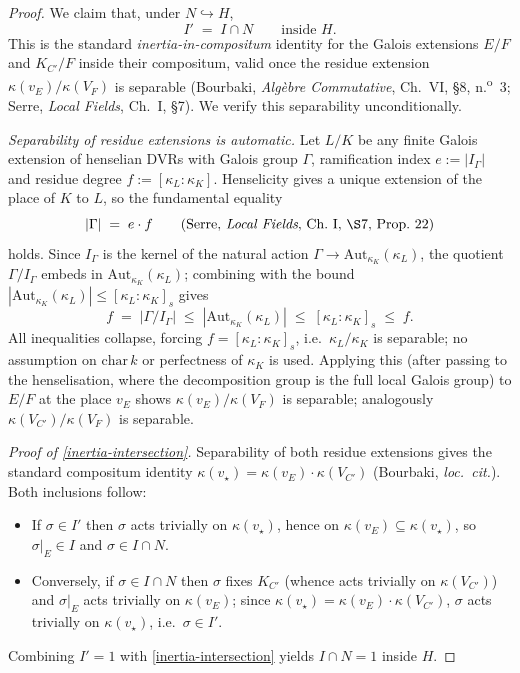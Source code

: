 \documentclass[11pt]{article}
\begin{document}
\begin{proof}
We claim that, under $N \hookrightarrow H$,
\begin{equation}\label{eq:inertia-intersection}
I' \;=\; I \cap N \qquad \text{inside } H .
\end{equation}
This is the standard \emph{inertia-in-compositum} identity for the Galois
extensions $E/F$ and $K_{C'}/F$ inside their compositum, valid once the
residue extension $\kappa(v_E)/\kappa(V_F)$ is separable (Bourbaki,
\emph{Algèbre Commutative}, Ch.~VI, \S8, n.\textsuperscript{o}~3; Serre,
\emph{Local Fields}, Ch.~I, \S7).  We verify this separability
unconditionally.

\medskip
\noindent\emph{Separability of residue extensions is automatic.}\quad
Let $L/K$ be any finite Galois extension of henselian DVRs with Galois
group $\Gamma$, ramification index $e := |I_\Gamma|$ and residue degree
$f := [\kappa_L : \kappa_K]$.  Henselicity gives a unique extension of the
place of $K$ to $L$, so the fundamental equality
\[
|\Gamma| \;=\; e \cdot f
\qquad\text{(Serre, \emph{Local Fields}, Ch.~I, \S7, Prop.~22)}
\]
holds.  Since $I_\Gamma$ is the kernel of the natural action
$\Gamma \to \mathrm{Aut}_{\kappa_K}(\kappa_L)$, the quotient
$\Gamma/I_\Gamma$ embeds in $\mathrm{Aut}_{\kappa_K}(\kappa_L)$; combining
with the bound
$|\mathrm{Aut}_{\kappa_K}(\kappa_L)| \leq [\kappa_L : \kappa_K]_s$ gives
\[
f \;=\; |\Gamma/I_\Gamma|
   \;\leq\; |\mathrm{Aut}_{\kappa_K}(\kappa_L)|
   \;\leq\; [\kappa_L : \kappa_K]_s
   \;\leq\; f .
\]
All inequalities collapse, forcing $f = [\kappa_L : \kappa_K]_s$, i.e.\
$\kappa_L/\kappa_K$ is separable; no assumption on $\mathrm{char}\,k$ or
perfectness of $\kappa_K$ is used.  Applying this (after passing to the
henselisation, where the decomposition group is the full local Galois
group) to $E/F$ at the place $v_E$ shows $\kappa(v_E)/\kappa(V_F)$ is
separable; analogously $\kappa(V_{C'})/\kappa(V_F)$ is separable.

\medskip
\noindent\emph{Proof of \eqref{inertia-intersection}.}\quad
Separability of both residue extensions gives the standard compositum
identity $\kappa(v_\star) = \kappa(v_E) \cdot \kappa(V_{C'})$ (Bourbaki,
\emph{loc.\ cit.}).  Both inclusions follow:
\begin{itemize}
\item If $\sigma \in I'$ then $\sigma$ acts trivially on $\kappa(v_\star)$,
      hence on $\kappa(v_E) \subseteq \kappa(v_\star)$, so $\sigma|_E \in I$
      and $\sigma \in I \cap N$.
\item Conversely, if $\sigma \in I \cap N$ then $\sigma$ fixes $K_{C'}$
      (whence acts trivially on $\kappa(V_{C'})$) and $\sigma|_E$ acts
      trivially on $\kappa(v_E)$; since
      $\kappa(v_\star) = \kappa(v_E) \cdot \kappa(V_{C'})$, $\sigma$ acts
      trivially on $\kappa(v_\star)$, i.e.\ $\sigma \in I'$.
\end{itemize}
Combining $I' = 1$ with \eqref{inertia-intersection} yields
$I \cap N = 1$ inside $H$.


\end{proof}
\end{document}
